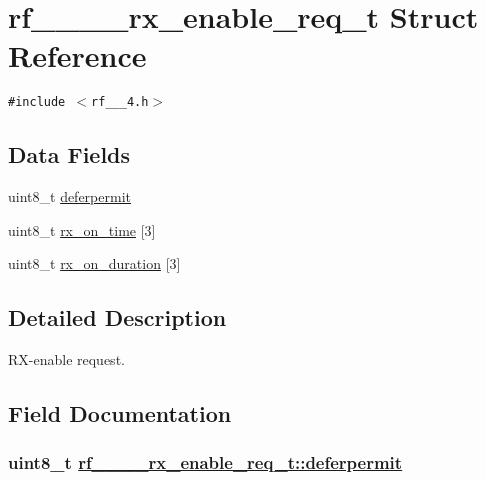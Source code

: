 \hypertarget{structrf__802__15__4__rx__enable__req__t}{
\section{rf\_\_\_\_\-rx\_\-enable\_\-req\_\-t Struct Reference}
\label{structrf__802__15__4__rx__enable__req__t}
}
{\tt \#include $<$rf\_\_\_\-4.h$>$}

\subsection*{Data Fields}
\begin{CompactItemize}
\item 
uint8\_\-t \hyperlink{structrf__802__15__4__rx__enable__req__t_7b3891493a7541dea9af84c3bf5cf387}{deferpermit}
\item 
uint8\_\-t \hyperlink{structrf__802__15__4__rx__enable__req__t_4d952ca97d8eb8df58e535c9e76b0c67}{rx\_\-on\_\-time} \mbox{[}3\mbox{]}
\item 
uint8\_\-t \hyperlink{structrf__802__15__4__rx__enable__req__t_bd360feb833cebf250df3569133ed945}{rx\_\-on\_\-duration} \mbox{[}3\mbox{]}
\end{CompactItemize}


\subsection{Detailed Description}
RX-enable request. 



\subsection{Field Documentation}
\hypertarget{structrf__802__15__4__rx__enable__req__t_7b3891493a7541dea9af84c3bf5cf387}{
\subsubsection[deferpermit]{\setlength{\rightskip}{0pt plus 5cm}uint8\_\-t \hyperlink{structrf__802__15__4__rx__enable__req__t_7b3891493a7541dea9af84c3bf5cf387}{rf\_\_\_\_\-rx\_\-enable\_\-req\_\-t::deferpermit}}}
\label{structrf__802__15__4__rx__enable__req__t_7b3891493a7541dea9af84c3bf5cf387}


